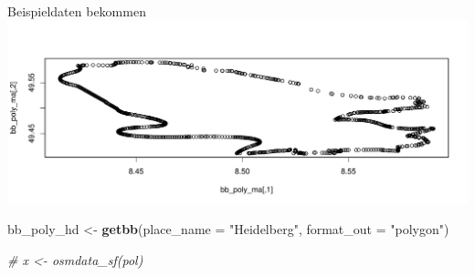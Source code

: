 \documentclass[ignorenonframetext,]{beamer}
\newenvironment{Shaded}{\begin{snugshade}}{\end{snugshade}}
\newcommand{\KeywordTok}[1]{\textcolor[rgb]{0.13,0.29,0.53}{\textbf{#1}}}
\newcommand{\DataTypeTok}[1]{\textcolor[rgb]{0.13,0.29,0.53}{#1}}
\newcommand{\StringTok}[1]{\textcolor[rgb]{0.31,0.60,0.02}{#1}}
\newcommand{\CommentTok}[1]{\textcolor[rgb]{0.56,0.35,0.01}{\textit{#1}}}
\newcommand{\NormalTok}[1]{#1}
\begin{document}
\begin{frame}[fragile]{Beispieldaten bekommen}
\includegraphics{simplefeatures_files/figure-beamer/unnamed-chunk-7-1.pdf}

\begin{Shaded}
\begin{Highlighting}[]
\NormalTok{bb_poly_hd <-}\StringTok{ }\KeywordTok{getbb}\NormalTok{(}\DataTypeTok{place_name =} \StringTok{"Heidelberg"}\NormalTok{, }
                 \DataTypeTok{format_out =} \StringTok{"polygon"}\NormalTok{)}
\end{Highlighting}
\end{Shaded}

\begin{Shaded}
\begin{Highlighting}[]
\CommentTok{# x <- osmdata_sf(pol)}
\end{Highlighting}
\end{Shaded}

\end{frame}
\end{document}
